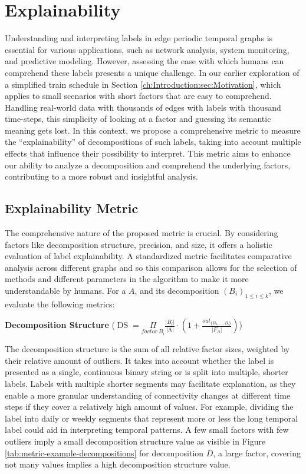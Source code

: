 \chapter{Explainability}
Understanding and interpreting labels in edge periodic temporal graphs is essential for various applications, such as network analysis, system monitoring, and predictive modeling.
However, assessing the ease with which humans can comprehend these labels presents a unique challenge.
In our earlier exploration of a simplified train schedule in Section \ref{ch:Introduction:sec:Motivation}, which applies to small scenarios with short factors that are easy to comprehend.
Handling real-world data with thousands of edges with labels with thousand time-steps, this simplicity of looking at a factor and guessing its semantic meaning gets lost.
In this context, we propose a comprehensive metric to measure the \enquote{explainability} of decompositions of such labels, taking into account multiple effects that influence their possibility to interpret.
This metric aims to enhance our ability to analyze a decomposition and comprehend the underlying factors, contributing to a more robust and insightful analysis.

\section{Explainability Metric}
The comprehensive nature of the proposed metric is crucial.
By considering factors like decomposition structure, precision, and size, it offers a holistic evaluation of label explainability.
A standardized metric facilitates comparative analysis across different graphs and so this comparison allows for the selection of methods and different parameters in the algorithm to make it more understandable by humans.
For a \DFA $A$, and its decomposition $(B_i)_{1 \leq i \leq k}$, we evaluate the following metrics:

\textbf{Decomposition Structure} ($\operatorname{DS} =  \underset{factor~ B_i}{\Pi}\frac{|B_i|}{\text{|A|}} \cdot (1 + \frac{out_{\{B_1,\dots,B_i\}}}{|F_A|})$)

The decomposition structure is the sum of all relative factor sizes, weighted by their relative amount of outliers.
It takes into account whether the label is presented as a single, continuous binary string or is split into multiple, shorter labels.
Labels with multiple shorter segments may facilitate explanation, as they enable a more granular understanding of connectivity changes at different time steps if they cover a relatively high amount of values.
For example, dividing the label into daily or weekly segments that represent more or less the long temporal label could aid in interpreting temporal patterns.
A few small factors with few outliers imply a small decomposition structure value as visible in Figure \ref{tab:metric-example-decompositions} for decomposition $D$, a large factor, covering not many values implies a high decomposition structure value.

